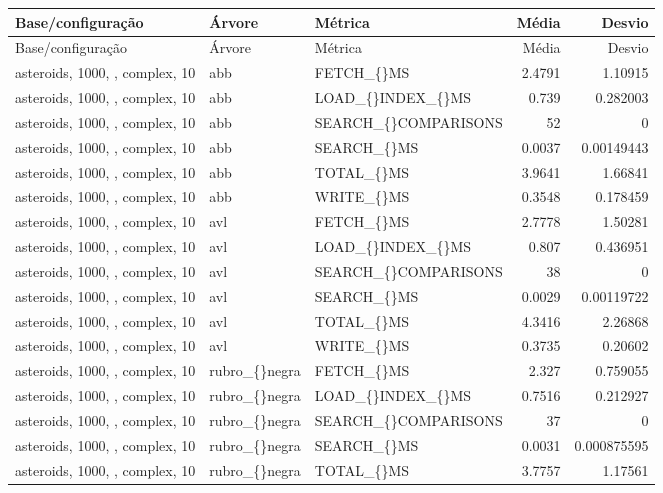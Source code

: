\scriptsize
\begin{longtable}{p{4cm}p{1.4cm}p{2.6cm}rr}
\hline
Base/configuração & Árvore & Métrica & Média & Desvio\\
\hline
\endfirsthead
\hline
Base/configuração & Árvore & Métrica & Média & Desvio\\
\hline
\endhead
asteroids, 1000, , complex, 10 & abb & FETCH\_\allowbreak\{\}MS & 2.4791 & 1.10915\\
asteroids, 1000, , complex, 10 & abb & LOAD\_\allowbreak\{\}INDEX\_\allowbreak\{\}MS & 0.739 & 0.282003\\
asteroids, 1000, , complex, 10 & abb & SEARCH\_\allowbreak\{\}COMPARISONS & 52 & 0\\
asteroids, 1000, , complex, 10 & abb & SEARCH\_\allowbreak\{\}MS & 0.0037 & 0.00149443\\
asteroids, 1000, , complex, 10 & abb & TOTAL\_\allowbreak\{\}MS & 3.9641 & 1.66841\\
asteroids, 1000, , complex, 10 & abb & WRITE\_\allowbreak\{\}MS & 0.3548 & 0.178459\\
asteroids, 1000, , complex, 10 & avl & FETCH\_\allowbreak\{\}MS & 2.7778 & 1.50281\\
asteroids, 1000, , complex, 10 & avl & LOAD\_\allowbreak\{\}INDEX\_\allowbreak\{\}MS & 0.807 & 0.436951\\
asteroids, 1000, , complex, 10 & avl & SEARCH\_\allowbreak\{\}COMPARISONS & 38 & 0\\
asteroids, 1000, , complex, 10 & avl & SEARCH\_\allowbreak\{\}MS & 0.0029 & 0.00119722\\
asteroids, 1000, , complex, 10 & avl & TOTAL\_\allowbreak\{\}MS & 4.3416 & 2.26868\\
asteroids, 1000, , complex, 10 & avl & WRITE\_\allowbreak\{\}MS & 0.3735 & 0.20602\\
asteroids, 1000, , complex, 10 & rubro\_\allowbreak\{\}negra & FETCH\_\allowbreak\{\}MS & 2.327 & 0.759055\\
asteroids, 1000, , complex, 10 & rubro\_\allowbreak\{\}negra & LOAD\_\allowbreak\{\}INDEX\_\allowbreak\{\}MS & 0.7516 & 0.212927\\
asteroids, 1000, , complex, 10 & rubro\_\allowbreak\{\}negra & SEARCH\_\allowbreak\{\}COMPARISONS & 37 & 0\\
asteroids, 1000, , complex, 10 & rubro\_\allowbreak\{\}negra & SEARCH\_\allowbreak\{\}MS & 0.0031 & 0.000875595\\
asteroids, 1000, , complex, 10 & rubro\_\allowbreak\{\}negra & TOTAL\_\allowbreak\{\}MS & 3.7757 & 1.17561\\

\end{longtable}

